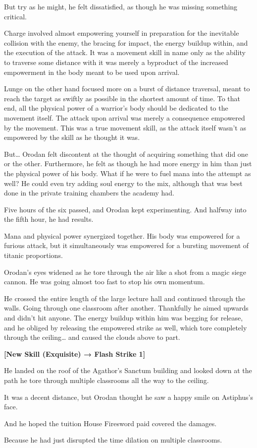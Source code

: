 \documentclass[a4paper,10pt]{book}
\begin{document}
But try as he might, he felt dissatisfied, as though he was missing something critical.\par
Charge involved almost empowering yourself in preparation for the inevitable collision with the enemy, the bracing for impact, the energy buildup within, and the execution of the attack. It was a movement skill in name only as the ability to traverse some distance with it was merely a byproduct of the increased empowerment in the body meant to be used upon arrival.\par
Lunge on the other hand focused more on a burst of distance traversal, meant to reach the target as swiftly as possible in the shortest amount of time. To that end, all the physical power of a warrior’s body should be dedicated to the movement itself. The attack upon arrival was merely a consequence empowered by the movement. This was a true movement skill, as the attack itself wasn’t as empowered by the skill as he thought it was.\par
But… Orodan felt discontent at the thought of acquiring something that did one or the other. Furthermore, he felt as though he had more energy in him than just the physical power of his body. What if he were to fuel mana into the attempt as well? He could even try adding soul energy to the mix, although that was best done in the private training chambers the academy had.\par
Five hours of the six passed, and Orodan kept experimenting. And halfway into the fifth hour, he had results.\par
Mana and physical power synergized together. His body was empowered for a furious attack, but it simultaneously was empowered for a bursting movement of titanic proportions.\par
Orodan’s eyes widened as he tore through the air like a shot from a magic siege cannon. He was going almost too fast to stop his own momentum.\par
He crossed the entire length of the large lecture hall and continued through the walls. Going through one classroom after another. Thankfully he aimed upwards and didn’t hit anyone. The energy buildup within him was begging for release, and he obliged by releasing the empowered strike as well, which tore completely through the ceiling… and caused the clouds above to part.\par
\textbf{[New Skill (Exquisite) → Flash Strike 1]}\par
He landed on the roof of the Agathor’s Sanctum building and looked down at the path he tore through multiple classrooms all the way to the ceiling.\par
It was a decent distance, but Orodan thought he saw a happy smile on Astiphus’s face.\par
And he hoped the tuition House Firesword paid covered the damages.\par
Because he had just disrupted the time dilation on multiple classrooms.\par
\end{document}
